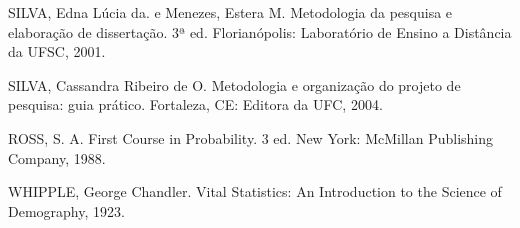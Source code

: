 SILVA, Edna Lúcia da. e Menezes, Estera M. Metodologia da pesquisa e elaboração de dissertação. 3ª ed. Florianópolis: Laboratório de Ensino a Distância da UFSC, 2001.\vskip0.3cm

SILVA, Cassandra Ribeiro de O. Metodologia e organização do projeto de pesquisa: guia prático. Fortaleza, CE: Editora da UFC, 2004.\vskip0.3cm

ROSS, S. A. First Course in Probability. 3 ed. New York:
McMillan Publishing Company, 1988.\vskip0.3cm


WHIPPLE, George Chandler. Vital Statistics: An Introduction to the Science of Demography, 1923. 







